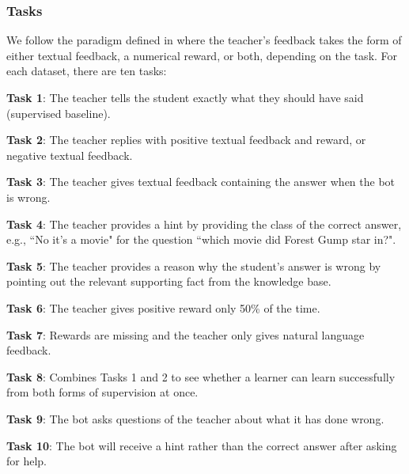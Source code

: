 \subsubsection{Tasks}
 We follow the paradigm defined in  where the teacher's feedback
 takes the form of either textual feedback, a numerical reward, or both, depending on the task.
For each dataset, there are ten tasks:
\begin{tightitemize}
\item {\bf   Task 1}: The teacher tells the student exactly what they should have said (supervised baseline).
\item {\bf  Task 2}:
The teacher replies with positive textual feedback and reward, or negative textual feedback. 
\item {\bf Task 3}: The teacher gives textual feedback containing the answer when the bot is wrong.
\item {\bf Task 4}: The teacher provides a hint by providing the class of the correct answer, e.g., ``No it's a movie" for the question ``which movie did Forest Gump star in?".
\item {\bf Task 5}: The teacher provides
a reason why the student's answer is wrong by pointing out the relevant supporting fact from the knowledge base.
\item {\bf Task 6}: The teacher gives positive reward only 50\% of the time. 
\item {\bf Task 7}: Rewards are missing and the teacher only gives natural language feedback.
\item {\bf Task 8}: Combines Tasks 1 and 2 to see whether a learner can learn successfully from both forms of supervision at once.
\item {\bf Task 9}:  The bot asks questions of the teacher about what it has done wrong.
\item {\bf Task 10}:  The bot will receive a hint rather than the correct answer after asking for help.
\end{tightitemize}
